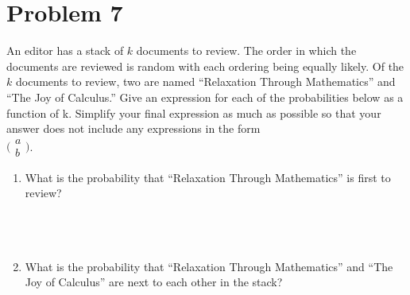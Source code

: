 \documentclass{amsart}
\theoremstyle{definition}
\theoremstyle{Exercise}
\theoremstyle{remark}
\theoremstyle{rule}
\numberwithin{equation}{section}
\begin{document}
\section*{Problem 7}
An editor has a stack of $k$ documents to review.  The order in which the documents are reviewed is random with each ordering being equally likely. Of the $k$ documents to review, two are named ``Relaxation Through Mathematics'' and ``The Joy of Calculus.'' Give an expression for each of the probabilities below as a function of k. Simplify your final expression as much as possible so that your answer does not include any expressions in the form\\
$
\Big(
 \begin{array}{c}
 a\\
 b
    \end{array}
    \Big)
$.
 \begin{enumerate}[label=(\alph*)]
\item What is the probability that ``Relaxation Through Mathematics'' is first to review?\\\\
\\\\
\item What is the probability that ``Relaxation Through Mathematics'' and ``The Joy of Calculus'' are next to each other in the stack?\\\\
\\\\
\end{enumerate}
\end{document}
